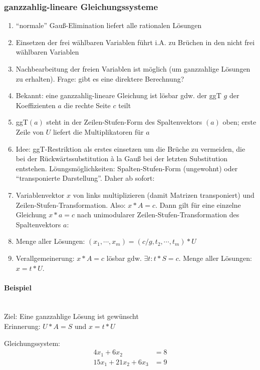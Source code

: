 \subsubsection{ganzzahlig-lineare Gleichungssysteme}
\begin{enumerate}
	\item ``normale'' Gauß-Elimination liefert alle rationalen Lösungen
	\item Einsetzen der frei wählbaren Variablen führt i.A. zu Brüchen in den nicht frei wählbaren Variablen
	\item Nachbearbeitung der freien Variablen ist möglich (um ganzzahlige Lösungen zu erhalten).
		Frage: gibt es eine direktere Berechnung?
	\item Bekannt: eine ganzzahlig-lineare Gleichung ist lösbar gdw. der ggT $g$ der Koeffizienten $a$ die rechte Seite $c$ teilt
	\item ggT$(a)$ steht in der Zeilen-Stufen-Form des Spaltenvektors $(a)$ oben; erste Zeile von $U$ liefert die Multiplikatoren für $a$
	\item Idee: ggT-Restriktion als erstes einsetzen um die Brüche zu vermeiden,
		die bei der Rückwärtssubstitution \`a la Gauß bei der letzten Substitution entstehen.
		Löungsmöglichkeiten: Spalten-Stufen-Form (ungewohnt) oder ``transponierte Darstellung''.
		Daher ab sofort:
	\item Variablenvektor $x$ von links multiplizieren (damit Matrizen transponiert) und Zeilen-Stufen-Transformation.
		Also: $x*A = c$. Dann gilt für eine einzelne Gleichung $x*a=c$ nach unimodularer Zeilen-Stufen-Transformation des Spaltenvektors $a$:
	\item Menge aller Lösungen: $(x_1,\cdots,x_m) = (c/g,t_2,\cdots,t_m)* U$
	\item Verallgemeinerung: $x*A = c$ lösbar gdw. $\exists t: t*S = c$. Menge aller Lösungen: $x = t*U$.
\end{enumerate}


\paragraph{Beispiel}\\
Ziel: Eine ganzzahlige Lösung ist gewünscht \\
Erinnerung: $U*A = S$ und $x = t*U$

Gleichungssystem:
\begin{align*}
  4x_1 +  6x_2         & = 8 \\
  15x_1 + 21x_2 + 6x_3 & = 9
\end{align*}

